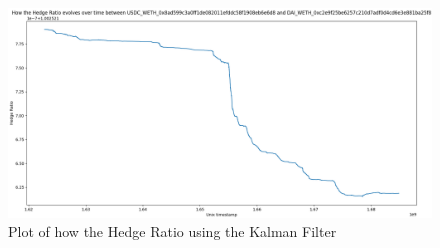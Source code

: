 \begin{figure}[!htb]
    \centering
    \includegraphics[width=\textwidth]{project/Images/Evolving_hedge_ratio_kf.png}
    \caption{Plot of how the Hedge Ratio using the Kalman Filter \label{fig:evolving_hedge_ratio_kf}}
\end{figure}

